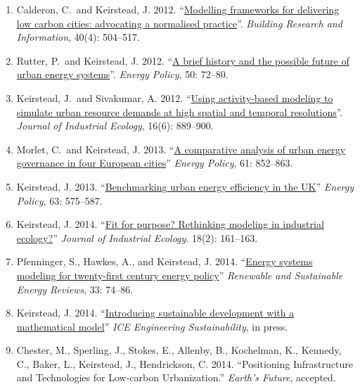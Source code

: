 \documentclass[11pt,a4paper]{article}
\begin{document}
\begin{enumerate}
\item Calderon, C.\  and Keirstead, J. 2012. ``\href{http://dx.doi.org/10.1080/09613218.2012.680702}{Modelling frameworks for delivering low carbon cities: advocating a normalised practice}''. \emph{Building Research and Information}, 40(4): 504--517.

\item Rutter, P.\ and Keirstead, J.  2012. ``\href{http://dx.doi.org/10.1016/j.enpol.2012.03.072}{A brief history and the possible future of urban energy systems}''. \emph{Energy Policy}, 50: 72--80.

\item Keirstead, J.\  and Sivakumar, A. 2012. ``\href{http://dx.doi.org/10.1111/j.1530-9290.2012.00486.x}{Using activity-based modeling to simulate urban resource demands at high spatial and temporal resolutions}''. \emph{Journal of Industrial Ecology}, 16(6): 889--900.

\item Morlet, C.\ and Keirstead, J. 2013. ``\href{http://dx.doi.org/10.1016/j.enpol.2013.06.085}{A comparative analysis of urban energy governance in four European cities}'' \emph{Energy Policy}, 61: 852--863.

\item Keirstead, J. 2013. ``\href{http://dx.doi.org/10.1016/j.enpol.2013.08.063}{Benchmarking urban energy efficiency in the UK}'' \emph{Energy Policy}, 63: 575--587.

\item Keirstead, J. 2014. ``\href{http://dx.doi.org/10.1111/jiec.12093}{Fit for purpose? Rethinking modeling in industrial ecology?}'' \emph{Journal of Industrial Ecology}. 18(2): 161--163.

\item Pfenninger, S., Hawkes, A., and Keirstead, J. 2014. ``\href{http://dx.doi.org/10.1016/j.rser.2014.02.003}{Energy systems modeling for twenty-first century energy policy}'' \emph{Renewable and Sustainable Energy Reviews}, 33: 74--86.

\item Keirstead, J.  2014.  ``\href{http://dx.doi.org/10.1680/ensu.13.00036}{Introducing sustainable development with a mathematical model}'' \emph{ICE Engineering Sustainability}, in press.

\item Chester, M., Sperling, J., Stokes, E., Allenby, B., Kochelman, K., Kennedy, C., Baker, L., Keirstead, J., Hendrickson, C. 2014. ``Positioning Infrastructure and Technologies for Low-carbon Urbanization.'' \emph{Earth's Future}, accepted.


\end{enumerate}
\end{document}
